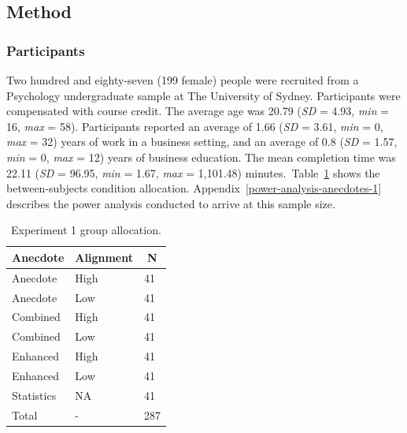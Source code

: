 \documentclass[a4paper, nobind, dvipsnames]{templates/ociamthesis}
\theoremstyle{definition}
\theoremstyle{definition}
\theoremstyle{definition}
\theoremstyle{definition}
\theoremstyle{remark}
\begin{document}
\hypertarget{method-anecdotes-1}{%
\subsection{Method}\label{method-anecdotes-1}}

\subsubsection{Participants}

Two hundred and eighty-seven (199 female) people were recruited from a Psychology undergraduate sample at The University of Sydney. Participants were compensated with course credit. The average age was 20.79 (\emph{SD} = 4.93, \emph{min} = 16, \emph{max} = 58). Participants reported an average of 1.66 (\emph{SD} = 3.61, \emph{min} = 0, \emph{max} = 32) years of work in a business setting, and an average of 0.8 (\emph{SD} = 1.57, \emph{min} = 0, \emph{max} = 12) years of business education. The mean completion time was 22.11 (\emph{SD} = 96.95, \emph{min} = 1.67, \emph{max} = 1,101.48) minutes.~Table~\ref{tab:condition-allocation-anecdotes-1}
shows the between-subjects condition allocation.
Appendix~\ref{power-analysis-anecdotes-1} describes the power analysis
conducted to arrive at this sample size.

\begin{table}[tbp]

\begin{center}
\begin{threeparttable}

\caption{\label{tab:condition-allocation-anecdotes-1}Experiment 1 group allocation.}

\begin{tabular}{lll}
\toprule
Anecdote & \multicolumn{1}{c}{Alignment} & \multicolumn{1}{c}{N}\\
\midrule
Anecdote & High & 41\\
Anecdote & Low & 41\\
Combined & High & 41\\
Combined & Low & 41\\
Enhanced & High & 41\\
Enhanced & Low & 41\\
Statistics & NA & 41\\
Total & - & 287\\
\bottomrule
\end{tabular}

\end{threeparttable}
\end{center}

\end{table}
\end{document}
